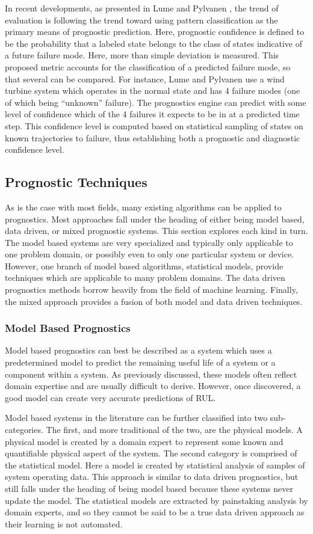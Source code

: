 \documentclass[12pt]{article}
\begin{document}
In recent developments, as presented in Lume and Pylvanen
\cite{6299510}, the trend of evaluation is following the trend toward
using pattern classification as the primary means of prognostic
prediction.  Here, prognostic confidence is defined to be the
probability that a labeled state belongs to the class of states
indicative of a future failure mode.  Here, more than simple deviation
is measured.  This proposed metric accounts for the classification of
a predicted failure mode, so that several can be compared.  For
instance, Lume and Pylvanen use a wind turbine system which operates
in the normal state and has 4 failure modes (one of which being
``unknown'' failure).  The prognostics engine can predict with some
level of confidence which of the 4 failures it expects to be in at a
predicted time step.  This confidence level is computed based on
statistical sampling of states on known trajectories to failure, thus
establishing both a prognostic and diagnostic confidence level.


\subsection{Prognostic Techniques}
As is the case with most fields, many existing algorithms can be
applied to prognostics.  Most approaches fall under the heading of
either being model based, data driven, or mixed prognostic systems.
This section explores each kind in turn. The model based systems are
very specialized and typically only applicable to one problem domain,
or possibly even to only one particular system or device.  However,
one branch of model based algorithms, statistical models, provide
techniques which are applicable to many problem domains.  The data
driven prognostics methods borrow heavily from the field of machine
learning.  Finally, the mixed approach provides a fusion of both model
and data driven techniques.

\subsubsection{Model Based Prognostics}
Model based prognostics can best be described as a system which uses a
predetermined model to predict the remaining useful life of a system
or a component within a system.  As previously discussed, these models
often reflect domain expertise and are usually difficult to derive.
However, once discovered, a good model can create very accurate
predictions of RUL.

Model based systems in the literature can be further classified into
two sub-categories.  The first, and more traditional of the two, are
the physical models.  A physical model is created by a domain expert
to represent some known and quantifiable physical aspect of the
system. The second category is comprised of the statistical model.
Here a model is created by statistical analysis of samples of system
operating data.  This approach is similar to data driven prognostics,
but still falls under the heading of being model based because these
systems never update the model.  The statistical models are extracted
by painstaking analysis by domain experts, and so they cannot be said
to be a true data driven approach as their learning is not automated.
\end{document}
